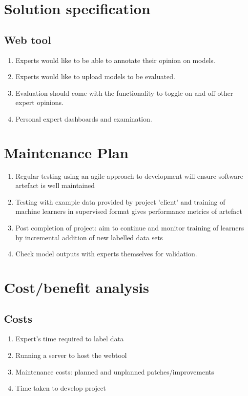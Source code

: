 \documentclass[11pt]{article} %
\numberwithin{equation}{section}
\begin{document}
\section{Solution specification}

\subsection{Web tool}

\begin{enumerate}
\item Experts would like to be able to annotate their opinion on models.
\item Experts would like to upload models to be evaluated.
\item Evaluation should come with the functionality to toggle on and off other expert opinions.
\item Personal expert dashboards and examination.
\end{enumerate}

\section{Maintenance Plan}
\begin{enumerate}
\item Regular testing using an agile approach to development will ensure software artefact is well maintained
\item Testing with example data provided by project 'client' and training of machine learners in supervised format gives performance metrics of artefact
\item Post completion of project: aim to continue and monitor training of learners by incremental addition of new labelled data sets
\item Check model outputs with experts themselves for validation.
\end{enumerate}

\section{Cost/benefit analysis}
\subsection{Costs}
\begin{enumerate}
\item Expert's time required to label data
\item Running a server to host the webtool
\item Maintenance costs: planned and unplanned patches/improvements
\item Time taken to develop project
\end{enumerate}
\end{document}
